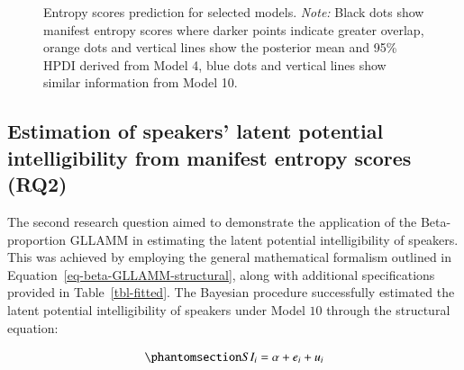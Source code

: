 \documentclass[
  authoryear,
  preprint,
  1p]{elsarticle}
\begin{document}
\label{cell-fig-rq1-pred-speaker}
\begin{figure}[H]


\caption{\label{fig-rq1-pred-speaker}Entropy scores prediction for
selected models. \emph{Note:} Black dots show manifest entropy scores
where darker points indicate greater overlap, orange dots and vertical
lines show the posterior mean and 95\% HPDI derived from Model 4, blue
dots and vertical lines show similar information from Model 10.}

\end{figure}%

\subsection{Estimation of speakers' latent potential intelligibility
from manifest entropy scores (RQ2)}\label{sec-R-RQ2}

The second research question aimed to demonstrate the application of the
Beta-proportion GLLAMM in estimating the latent potential
intelligibility of speakers. This was achieved by employing the general
mathematical formalism outlined in
Equation~\ref{eq-beta-GLLAMM-structural}, along with additional
specifications provided in Table~\ref{tbl-fitted}. The Bayesian
procedure successfully estimated the latent potential intelligibility of
speakers under Model \(10\) through the structural equation:

\begin{equation}\phantomsection\label{eq-beta-GLLAMM-structural-model10}{
SI_{i} = \alpha + e_{i} + u_{i}
}\end{equation}
\end{document}
